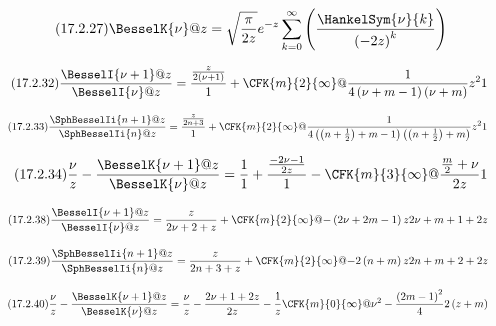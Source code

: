 \documentclass[11pt]{article}
\begin{document}
\begin{equation*}\tag{17.2.27}
  \BesselK{\nu}@{z}
  = \sqrt{\frac{\pi}{2z}}e^{-z} \sum_{k=0}^\infty \left(\frac{\HankelSym{\nu}{k}}{\left(-2z\right)^{k}}\right)
\end{equation*}

\begin{equation*}\tag{17.2.32}
  \frac{\BesselI{\nu+1}@{z}}{\BesselI{\nu}@{z}}
  = \frac{\frac{z}{2\left(\nu+1\right)}}{1}+\CFK{m}{2}{\infty}@{\frac{1}{4\left(\nu+m-1\right)\left(\nu+m\right)}z^{2}}{1}
\end{equation*}

\begin{equation*}\tag{17.2.33}
  \frac{\SphBesselIi{n+1}@{z}}{\SphBesselIi{n}@{z}}
  = \frac{\frac{z}{2n+3}}{1}+\CFK{m}{2}{\infty}@{\frac{1}{4\left(\left(n+\frac{1}{2}\right)+m-1\right)\left(\left(n+\frac{1}{2}\right)+m\right)}z^{2}}{1}
\end{equation*}

\begin{equation*}\tag{17.2.34}
  \frac{\nu}{z}-\frac{\BesselK{\nu+1}@{z}}{\BesselK{\nu}@{z}}
  = \frac{1}{1}+\frac{\frac{-2\nu-1}{2z}}{1}-\CFK{m}{3}{\infty}@{\frac{\frac{m}{2}+\nu}{2z}}{1}
\end{equation*}

\begin{equation*}\tag{17.2.38}
  \frac{\BesselI{\nu+1}@{z}}{\BesselI{\nu}@{z}}
  = \frac{z}{2\nu+2+z}+\CFK{m}{2}{\infty}@{-\left(2\nu+2m-1\right)z}{2\nu+m+1+2z}
\end{equation*}

\begin{equation*}\tag{17.2.39}
  \frac{\SphBesselIi{n+1}@{z}}{\SphBesselIi{n}@{z}}
  = \frac{z}{2n+3+z}+\CFK{m}{2}{\infty}@{-2\left(n+m\right)z}{2n+m+2+2z}
\end{equation*}

\begin{equation*}\tag{17.2.40}
  \frac{\nu}{z}-\frac{\BesselK{\nu+1}@{z}}{\BesselK{\nu}@{z}}
  = \frac{\nu}{z}-\frac{2\nu+1+2z}{2z}-\frac{1}{z} \CFK{m}{0}{\infty}@{\nu^{2}-\frac{\left(2m-1\right)^{2}}{4}}{2\left(z+m\right)}
\end{equation*}
\end{document}
